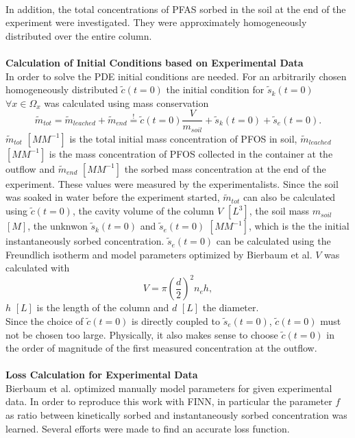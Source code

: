 \\
In addition, the total concentrations of PFAS sorbed in the soil at the end of the experiment were investigated. They were approximately homogeneously distributed over the entire column.\\
\\
\textbf{Calculation of Initial Conditions based on Experimental Data}
\\
In order to solve the PDE initial conditions are needed. For an arbitrarily chosen homogeneously distributed $\tilde{c}(t=0)$ the initial condition for $\tilde{s}_k(t=0)$ $\forall x \in \Omega_x$ was calculated using mass conservation
\begin{equation}
    \tilde{m}_{tot} = \tilde{m}_{leached} + \tilde{m}_{end} \overset{!}{=} \tilde{c}(t=0) \frac{V}{m_{soil}} +  \tilde{s}_k(t=0) +\tilde{s}_e(t=0).
    \label{eq:mass_cons}
\end{equation}
$\tilde{m}_{tot}$ $[M M^{-1}]$ is the total initial mass concentration of PFOS in soil, $\tilde{m}_{leached}$ $[M M^{-1}]$ is the mass concentration of PFOS collected in the container at the outflow and $\tilde{m}_{end}$ $[M M^{-1}]$ the sorbed mass concentration at the end of the experiment. These values were measured by the experimentalists. Since the soil was soaked in water before the experiment started, $\tilde{m}_{tot}$ can also be calculated using $\tilde{c}(t=0)$, the cavity volume of the column $V$ $[L^3]$, the soil mass $m_{soil}$ $[M]$, the unknwon $\tilde{s}_k(t=0)$ and $\tilde{s}_e(t=0)$ $[M M^{-1}]$, which is the the initial instantaneously sorbed concentration. $\tilde{s}_e(t=0)$ can be calculated using the Freundlich isotherm and model parameters optimized by Bierbaum et al. $V$ was calculated with
\begin{equation}
    V = \pi \left(\frac{d}{2}\right)^2 n_e h,
\end{equation}
$h$ $[L]$ is the length of the column and $d$ $[L]$ the diameter.\\
Since the choice of $\tilde{c}(t=0)$ is directly coupled to $\tilde{s}_e(t=0)$, $\tilde{c}(t=0)$ must not be chosen too large. Physically, it also makes sense to choose $\tilde{c}(t=0)$ in the order of magnitude of the first measured concentration at the outflow.
\\
\\
\textbf{Loss Calculation for Experimental Data}
\\
Bierbaum et al. optimized manually model parameters for given experimental data. In order to reproduce this work with FINN, in particular the parameter $f$ as ratio between kinetically sorbed and instantaneously sorbed concentration was learned. Several efforts were made to find an accurate loss function.\\
